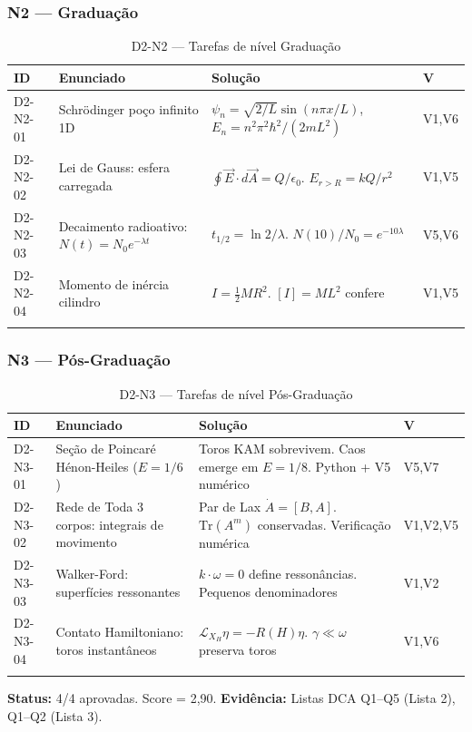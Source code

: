 \documentclass[12pt,a4paper,oneside]{article}
\begin{document}
\subsubsection{N2 — Graduação}

\begin{longtable}{p{}p{}p{}p{}}
\toprule
\textbf{ID} & \textbf{Enunciado} & \textbf{Solução} & \textbf{V} \\
\midrule
D2-N2-01 & Schrödinger poço infinito 1D & $\psi_n=\sqrt{2/L}\sin(n\pi x/L)$, $E_n=n^2\pi^2\hbar^2/(2mL^2)$ & V1,V6 \\
D2-N2-02 & Lei de Gauss: esfera carregada & $\oint\vec{E}\cdot d\vec{A}=Q/\epsilon_0$. $E_{r>R}=kQ/r^2$ & V1,V5 \\
D2-N2-03 & Decaimento radioativo: $N(t)=N_0e^{-\lambda t}$ & $t_{1/2}=\ln 2/\lambda$. $N(10)/N_0=e^{-10\lambda}$ & V5,V6 \\
D2-N2-04 & Momento de inércia cilindro & $I=\frac{1}{2}MR^2$. $[I]=ML^2$ confere & V1,V5 \\
\bottomrule
\caption{D2-N2 — Tarefas de nível Graduação}
\end{longtable}

\subsubsection{N3 — Pós-Graduação}

\begin{longtable}{p{}p{}p{}p{}}
\toprule
\textbf{ID} & \textbf{Enunciado} & \textbf{Solução} & \textbf{V} \\
\midrule
D2-N3-01 & Seção de Poincaré Hénon-Heiles ($E=1/6$) & Toros KAM sobrevivem. Caos emerge em $E=1/8$. Python + V5 numérico & V5,V7 \\
D2-N3-02 & Rede de Toda 3 corpos: integrais de movimento & Par de Lax $\dot{A}=[B,A]$. $\text{Tr}(A^m)$ conservadas. Verificação numérica & V1,V2,V5 \\
D2-N3-03 & Walker-Ford: superfícies ressonantes & $k\cdot\omega=0$ define ressonâncias. Pequenos denominadores & V1,V2 \\
D2-N3-04 & Contato Hamiltoniano: toros instantâneos & $\mathcal{L}_{X_H}\eta=-R(H)\eta$. $\gamma\ll\omega$ preserva toros & V1,V6 \\
\bottomrule
\caption{D2-N3 — Tarefas de nível Pós-Graduação}
\end{longtable}

\textbf{Status:} 4/4 aprovadas. Score = 2,90. \textbf{Evidência:} Listas DCA
Q1--Q5 (Lista 2), Q1--Q2 (Lista 3).
\end{document}

